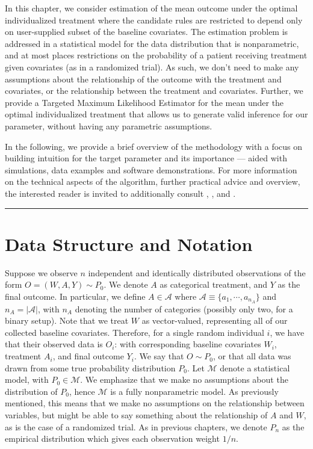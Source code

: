 \documentclass[
  12pt, krantz2,
]{krantz}
\theoremstyle{definition}
\theoremstyle{definition}
\theoremstyle{definition}
\newcommand{\1}{\mathbbm{1}}
\begin{document}
In this chapter, we consider estimation of the mean outcome under the optimal
individualized treatment where the candidate rules are restricted to depend only
on user-supplied subset of the baseline covariates. The estimation problem is
addressed in a statistical model for the data distribution that is
nonparametric, and at most places restrictions on the probability of a patient
receiving treatment given covariates (as in a randomized trial). As such, we
don't need to make any assumptions about the relationship of the outcome with
the treatment and covariates, or the relationship between the treatment and
covariates. Further, we provide a Targeted Maximum Likelihood Estimator for the
mean under the optimal individualized treatment that allows us to generate valid
inference for our parameter, without having any parametric assumptions.

In the following, we provide a brief overview of the methodology with a focus on
building intuition for the target parameter and its importance --- aided with simulations,
data examples and software demonstrations. For more information on the technical aspects
of the algorithm, further practical advice and overview, the interested reader is invited to
additionally consult \citet{vanderLaanLuedtke15}, \citet{luedtke2016super}, \citet{montoya2021optimal} and \citet{montoya2021performance}.

\begin{center}\rule{0.5\linewidth}{0.5pt}\end{center}

\hypertarget{data-structure-and-notation}{%
\section{Data Structure and Notation}\label{data-structure-and-notation}}

Suppose we observe \(n\) independent and identically distributed observations of
the form \(O=(W,A,Y) \sim P_0\). We denote \(A\) as categorical treatment, and \(Y\)
as the final outcome. In particular, we define \(A \in \mathcal{A}\) where
\(\mathcal{A} \equiv \{a_1, \cdots, a_{n_A} \}\) and \(n_A = |\mathcal{A}|\), with
\(n_A\) denoting the number of categories (possibly only two, for a binary setup).
Note that we treat \(W\) as vector-valued, representing all of our collected
baseline covariates. Therefore, for a single random individual \(i\), we have that
their observed data is \(O_i\): with corresponding baseline covariates \(W_i\),
treatment \(A_i\), and final outcome \(Y_i\). We say that \(O \sim P_0\), or that all
data was drawn from some true probability distribution \(P_0\). Let \(\mathcal{M}\)
denote a statistical model, with \(P_0 \in \mathcal{M}\). We emphasize that we
make no assumptions about the distribution of \(P_0\), hence \(\mathcal{M}\) is a
fully nonparametric model. As previously mentioned, this means that we make no
assumptions on the relationship between variables, but might be able to say
something about the relationship of \(A\) and \(W\), as is the case of a randomized
trial. As in previous chapters, we denote \(P_n\) as the empirical distribution
which gives each observation weight \(1/n\).
\end{document}
